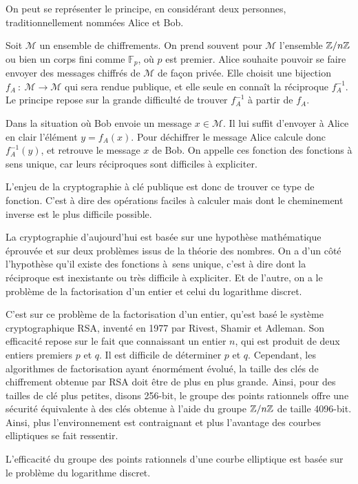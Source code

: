 On peut se représenter le principe, en considérant deux personnes, traditionnellement
nommées
Alice et Bob.

Soit $\mathcal{M}$ un ensemble de chiffrements. On prend souvent pour $\mathcal{M}$
l'ensemble $\mathbb{Z} / n \mathbb{Z}$ ou bien un corps fini comme $\mathbb{F}_{p}$, où $p$ est
premier. Alice souhaite pouvoir se faire envoyer des
messages chiffrés de $\mathcal{M}$ de façon privée. Elle choisit une bijection $f_{A}\ :\
\mathcal{M}\to \mathcal{M}$ qui sera rendue publique, et elle seule en connaît la réciproque
$f_{A}^{-1}$. Le principe repose sur la grande difficulté de trouver $f_{A}^{-1}$ à partir de
$f_{A}$. 

Dans la situation où Bob envoie un message $x \in \mathcal{M}$. Il lui suffit
d'envoyer à Alice en clair l'élément $y = f_{A}(x)$. Pour déchiffrer le message Alice
calcule donc $f_{A}^{-1}(y)$, et retrouve le message $x$ de Bob. On appelle ces fonction des fonctions à sens unique, car leurs réciproques sont difficiles à expliciter.

L'enjeu de la cryptographie à clé publique est donc de trouver ce type de fonction.
C'est à dire des opérations faciles à calculer mais dont le cheminement inverse est le plus
difficile possible.

La cryptographie d'aujourd'hui est basée sur une hypothèse mathématique éprouvée et sur deux
problèmes issus de la théorie des nombres. On a d'un côté l'hypothèse qu'il existe des
fonctions à sens unique, c'est à dire dont la réciproque est inexistante ou très difficile à
expliciter. Et de l'autre, on a
le problème de la factorisation d'un entier et celui du logarithme discret.

C'est sur ce problème de la factorisation d'un entier, qu'est basé le système cryptographique RSA, inventé en 1977 par Rivest,
Shamir et Adleman. Son efficacité repose sur le fait que connaissant un entier $n$, qui
est produit de deux entiers premiers $p$ et $q$. Il est difficile de déterminer $p$ et
$q$. Cependant, les algorithmes de factorisation ayant énormément évolué, la taille des
clés de chiffrement obtenue par RSA doit être de plus en plus grande. Ainsi, pour des
tailles de clé plus petites, disons 256-bit, le groupe des points rationnels offre une sécurité équivalente à
des clés obtenue à l'aide du groupe $\mathbb{Z} / n\mathbb{Z}$ de taille 4096-bit. Ainsi, plus l'environnement
est contraignant et plus l'avantage des courbes elliptiques se fait ressentir.

L'efficacité du groupe des points rationnels d'une courbe elliptique est basée sur le
problème du logarithme discret. 

